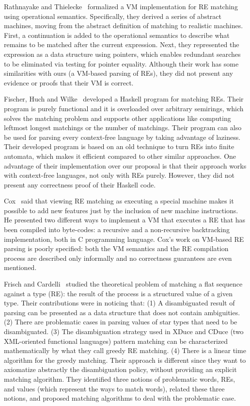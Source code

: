 \documentclass[review]{elsarticle}
\theoremstyle{definition}
\begin{document}
Rathnayake and Thielecke~\cite{Rathnayake2011} formalized a VM implementation for RE matching using
operational semantics. Specifically, they derived a series of abstract machines, moving from the abstract
definition of matching to realistic machines. First, a continuation is added to the operational semantics
to describe what remains to be matched after the current expression. Next, they represented the expression
as a data structure using pointers, which enables redundant searches to be eliminated via testing for pointer
equality. Although their work has some similarities with ours (a VM-based parsing of REs), they did not present
any evidence or proofs that their VM is correct.

Fischer, Huch and Wilke~\cite{Fischer2010} developed a Haskell program for matching REs. Their program is purely
functional and it is overloaded over arbitrary semirings, which solves the matching problem and supports other
applications like computing leftmost longest matchings or the number of matchings. Their program can also be used
for parsing every context-free language by taking advantage of laziness. Their developed program is based on an
old technique to turn REs into finite automata, which makes it efficient compared to other similar approaches.
One advantage of their implementation over our proposal is that their approach works with context-free languages,
not only with REs purely. However, they did not present any correctness proof of their Haskell code.

Cox~\cite{Cox2009} said that viewing RE matching as executing a special machine makes it possible to add new features just by the inclusion of new machine instructions. He presented two different ways to implement a VM that executes a RE that has been compiled into  byte-codes: a recursive and a non-recursive backtracking implementation, both in C programming language. Cox's work on VM-based RE parsing is poorly specified: both the VM semantics and the RE compilation process are described only informally and no correctness guarantees are even mentioned.

Frisch and Cardelli~\cite{Frisch2004} studied the theoretical problem of matching a flat sequence against a type (RE): the result of the process is a structured value of a given type. Their contributions were in noticing that: (1) A disambiguated result of parsing can be presented as a data structure that does not contain ambiguities. (2) There are problematic cases in parsing values of star types that need to be disambiguated. (3) The disambiguation strategy used in XDuce and CDuce (two XML-oriented functional languages) pattern matching can be characterized mathematically by what they call greedy RE matching. (4) There is a linear time algorithm for the greedy matching. Their approach is different since they want to axiomatize abstractly the disambiguation policy, without providing an explicit matching algorithm. They identified three notions of problematic words, REs, and values (which represent the ways to match words), related these three notions, and proposed matching algorithms to deal with the problematic case.
\end{document}

